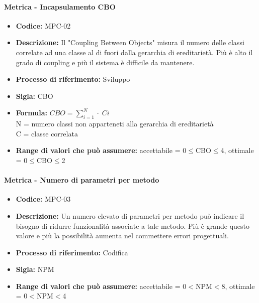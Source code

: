     \paragraph{Metrica - Incapsulamento CBO}
    \begin{itemize}
        \item \textbf{Codice:} MPC-02
        \item \textbf{Descrizione:} Il "Coupling Between Objects" misura il numero delle classi correlate ad una classe al di fuori dalla gerarchia di ereditarietà. Più è alto il grado di coupling e più il sistema è difficile da mantenere.
        \item \textbf{Processo di riferimento:} Sviluppo
        \item \textbf{Sigla:} CBO
        \item \textbf{Formula:} \begin{math}{CBO = {\sum_{i=1}^{N} \cdot \; Ci}}\end{math} \\ N = numero classi non apparteneti alla gerarchia di ereditarietà \\ C = classe correlata
        \item \textbf{Range di valori che può assumere:} accettabile = 0$\leq$CBO$\leq$4, ottimale = 0$\leq$CBO$\leq$2
    \end{itemize}

    \paragraph{Metrica - Numero di parametri per metodo} 
    \begin{itemize}
        \item \textbf{Codice:} MPC-03
        \item \textbf{Descrizione:} Un numero elevato di parametri per metodo può indicare il bisogno di ridurre funzionalità associate a tale metodo. Più è grande questo valore e più la possibilità aumenta nel commettere errori progettuali.
        \item \textbf{Processo di riferimento:} Codifica
        \item \textbf{Sigla:} NPM
        \item \textbf{Range di valori che può assumere:} accettabile = 0$<$NPM$<$8, ottimale = 0$<$NPM$<$4
    \end{itemize}

